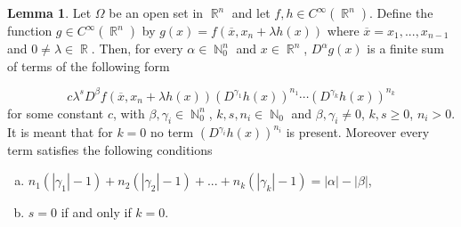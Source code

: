 \documentclass[12pt]{article}
\theoremstyle{definition}
\newtheorem{lemma}{Lemma}
\DeclareMathOperator\rr{\mathbb{R}}
\DeclareMathOperator\nn{\mathbb{N}}
\begin{document}
\begin{lemma}\label{derivatives}
Let $\Omega$ be an open set in $\rr^n$ and let $f,h \in C^\infty(\rr^n)$. Define the function $g\in C^\infty(\rr^n)$ by $g(x)=f(\overline x, x_n+\lambda h(x))$ where $\overline x=x_1,...,x_{n-1}$ and $0\neq\lambda \in \rr.$ Then, for every $\alpha \in \nn_0^n$ and $x \in \rr^n$, $D^\alpha g(x)$ is a finite sum of terms of the following form

\[
c\lambda^s D^{\beta} f(\overline x, x_n+\lambda h(x))(D^{\gamma_1}h(x))^{n_1}\cdots (D^{\gamma_k}h(x))^{n_k}
\]
for some constant $c$, with $\beta,\gamma_i \in \nn_0^n $, $k,s,n_i \in \nn_0$ and $\beta,\gamma_i\neq0$, $k,s\ge 0$, $n_i>0$. It is meant that for $k=0$ no term $(D^{\gamma_i}h(x))^{n_i}$ is present. Moreover every term satisfies the following conditions
\begin{enumerate}[a)]
\item $n_1(|\gamma_1|-1)+n_2(|\gamma_2|-1)+...+n_k(|\gamma_k|-1)=|\alpha|-|\beta|$,
\item  $s=0$ if and only if $k=0$.
\end{enumerate}
\end{lemma}
\end{document}
